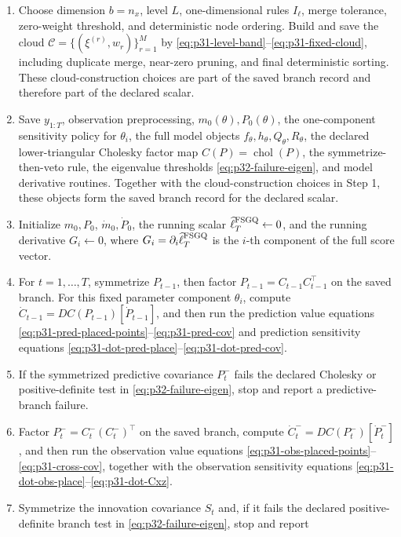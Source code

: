 \documentclass[11pt]{article}
\numberwithin{equation}{section}
\newcommand{\chol}{\operatorname{chol}}
\newcommand{\ellhat}{\widehat\ell}
\begin{document}
{\begin{minipage}{0.94\linewidth}
\begin{enumerate}[leftmargin=0.22in]
\item Choose dimension \(b=n_x\), level \(L\), one-dimensional rules
\(I_\ell\), merge tolerance, zero-weight threshold, and deterministic node
ordering.  Build and save the cloud \(\mathcal C=\{(\xi^{(r)},w_r)\}_{r=1}^M\)
by \eqref{eq:p31-level-band}--\eqref{eq:p31-fixed-cloud}, including duplicate
merge, near-zero pruning, and final deterministic sorting.  These cloud-construction
choices are part of the saved branch record and therefore part of the declared
scalar.
\item Save \(y_{1:T}\), observation preprocessing, \(m_0(\theta),P_0(\theta)\),
the one-component sensitivity policy for \(\theta_i\), the full model objects
\(f_\theta,h_\theta,Q_\theta,R_\theta\), the declared lower-triangular Cholesky
factor map \(C(P)=\chol(P)\), the symmetrize-then-veto rule, the eigenvalue thresholds
\eqref{eq:p32-failure-eigen}, and model derivative routines.  Together with the
cloud-construction choices in Step 1, these objects form the saved branch
record for the declared scalar.
\item Initialize \(m_0,P_0\), \(\dot m_0,\dot P_0\), the running scalar
\(\ellhat_T^{\rm FSGQ}\gets 0\), and the running derivative
\(G_i\gets 0\), where \(G_i=\partial_i\ellhat_T^{\rm FSGQ}\) is the
\(i\)-th component of the full score vector.
\item For \(t=1,\ldots,T\), symmetrize \(P_{t-1}\), then factor
\(P_{t-1}=C_{t-1}C_{t-1}^\top\) on the saved branch.  For this fixed
parameter component \(\theta_i\), compute
\(\dot C_{t-1}=DC(P_{t-1})[\dot P_{t-1}]\), and then run the prediction value
 equations \eqref{eq:p31-pred-placed-points}--\eqref{eq:p31-pred-cov} and
prediction sensitivity equations \eqref{eq:p31-dot-pred-place}--\eqref{eq:p31-dot-pred-cov}.
\item If the symmetrized predictive covariance \(P_t^-\) fails the declared
Cholesky or positive-definite test in \eqref{eq:p32-failure-eigen}, stop and
report a predictive-branch failure.
\item Factor \(P_t^-=C_t^-(C_t^-)^\top\) on the saved branch, compute
\(\dot C_t^-=DC(P_t^-)[\dot P_t^-]\), and then run the observation value
equations \eqref{eq:p31-obs-placed-points}--\eqref{eq:p31-cross-cov}, together
with the observation sensitivity equations \eqref{eq:p31-dot-obs-place}--\eqref{eq:p31-dot-Cxz}.
\item Symmetrize the innovation covariance \(S_t\) and, if it fails the declared
positive-definite branch test in \eqref{eq:p32-failure-eigen}, stop and report

\end{enumerate}
\end{minipage}}
\end{document}
